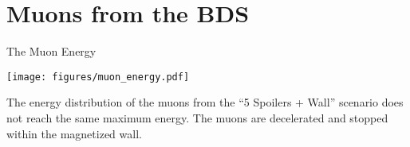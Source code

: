 \documentclass[xcolor={dvipsnames}]{beamer}
\begin{document}
\section{Muons from the BDS}
\begin{frame}{The Muon Energy}
\begin{center}
  \texttt{[image: figures/muon\_energy.pdf]}
\end{center}
The energy distribution of the muons from the ``5 Spoilers + Wall'' scenario does not reach the same maximum energy. The muons are decelerated and stopped within the magnetized wall.
\end{frame}
\end{document}
